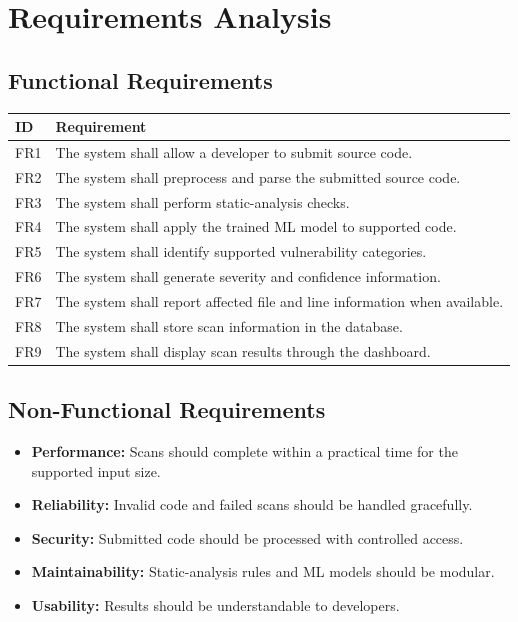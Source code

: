 \documentclass[12pt,a4paper]{report}
\begin{document}
\chapter{Requirements Analysis}

\section{Functional Requirements}
\begin{longtable}{p{1.2cm}p{13cm}}
\toprule
\textbf{ID} & \textbf{Requirement}\\
\midrule
\endhead
FR1 & The system shall allow a developer to submit source code.\\
FR2 & The system shall preprocess and parse the submitted source code.\\
FR3 & The system shall perform static-analysis checks.\\
FR4 & The system shall apply the trained ML model to supported code.\\
FR5 & The system shall identify supported vulnerability categories.\\
FR6 & The system shall generate severity and confidence information.\\
FR7 & The system shall report affected file and line information when available.\\
FR8 & The system shall store scan information in the database.\\
FR9 & The system shall display scan results through the dashboard.\\
\bottomrule
\end{longtable}

\section{Non-Functional Requirements}
\begin{itemize}[noitemsep]
  \item \textbf{Performance:} Scans should complete within a practical time for the supported input size.
  \item \textbf{Reliability:} Invalid code and failed scans should be handled gracefully.
  \item \textbf{Security:} Submitted code should be processed with controlled access.
  \item \textbf{Maintainability:} Static-analysis rules and ML models should be modular.
  \item \textbf{Usability:} Results should be understandable to developers.
\end{itemize}
\end{document}

